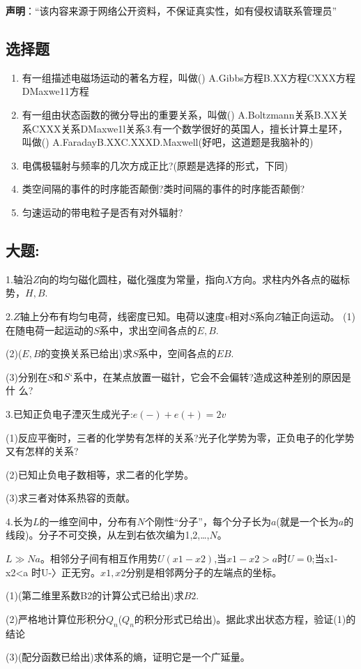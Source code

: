 
\textbf{声明}：“该内容来源于网络公开资料，不保证真实性，如有侵权请联系管理员”

\subsection{选择题}
\begin{enumerate}
\item 有一组描述电磁场运动的著名方程，叫做()
A.Gibbs方程B.XX方程CXXX方程DMaxwe11方程
\item 有一组由状态函数的微分导出的重要关系，叫做()
A.Boltzmann关系B.XX关系CXXX关系DMaxwe1l关系3.有一个数学很好的英国人，擅长计算土星环，叫做()
A.FaradayB.XXC.XXXD.Maxwell(好吧，这道题是我脑补的)
\item 电偶极辐射与频率的几次方成正比?(原题是选择的形式，下同)
\item 类空间隔的事件的时序能否颠倒?类时间隔的事件的时序能否颠倒?
\item 匀速运动的带电粒子是否有对外辐射?
\end{enumerate}
\subsection{大题:}

1.轴沿$Z$向的均匀磁化圆柱，磁化强度为常量，指向$X$方向。求柱内外各点的磁标势，$H,B$.

2.$Z$轴上分布有均匀电荷，线密度已知。电荷以速度$v$相对$S$系向$Z$轴正向运动。
(1)在随电荷一起运动的$S$系中，求出空间各点的$E,B$.

(2)($E,B$的变换关系已给出)求$S$系中，空间各点的$EB$.

(3)分别在$S$和$S`$系中，在某点放置一磁针，它会不会偏转?造成这种差别的原因是什
么?

3.已知正负电子湮灭生成光子:$e(-)+e(+)=2v$

(1)反应平衡时，三者的化学势有怎样的关系?光子化学势为零，正负电子的化学势又有怎样的关系?

(2)已知止负电子数相等，求二者的化学势。

(3)求三者对体系热容的贡献。

4.长为$L$的一维空间中，分布有$N$个刚性“分子”，每个分子长为$a$(就是一个长为$a$的线段)。分子不可交换，从左到右依次编为1,2,…,$N$。

$L\gg Na$。相邻分子间有相互作用势$U(x1-x2)$,当$x1-x2>a$时$U=0$;当x1-x2<a 时U-〉正无穷。$x1,x2$分别是相邻两分子的左端点的坐标。

(1)(第二维里系数B2的计算公式已给出)求$B2$.

(2)严格地计算位形积分$Q_n$($Q_n$的积分形式已给出)。据此求出状态方程，验证(1)的结论

(3)(配分函数已给出)求体系的熵，证明它是一个广延量。


